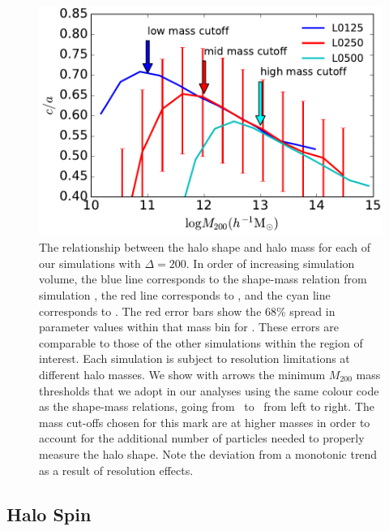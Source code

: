 \documentclass[usenatbib,fleqn]{mnras}
\begin{document}
\begin{figure}
\centering
\includegraphics[width=\columnwidth]{masscut_shape_d200.pdf}
\caption{
The relationship between the halo shape and halo mass for each of our simulations with $\Delta =200$. 
In order of increasing simulation volume, the blue line corresponds to the shape-mass relation from simulation 
\simA, the red line corresponds to \simB, and the cyan line corresponds to \simC. The red error bars show the 68\% spread in
parameter values within that mass bin for \simB. These errors are comparable to those of the other simulations
within the region of interest.
Each simulation is subject to resolution limitations at different halo masses. We show with arrows 
the minimum $M_{200}$ mass thresholds that we adopt in our analyses using the same colour code as 
the shape-mass relations, going from \simA \ to \simC \ from left to right. The mass cut-offs chosen for this mark
are at higher masses in order to account for the additional number of particles needed to properly measure the
halo shape. Note the deviation from a monotonic trend as a result of resolution effects.
}
\label{fig:srelation}
\end{figure}

\subsection{Halo Spin}
\end{document}
